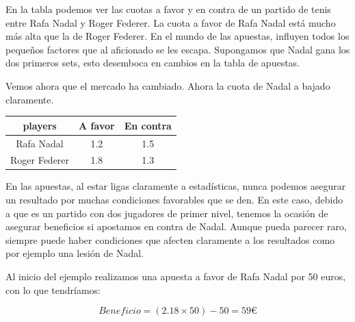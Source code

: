 
En la tabla
podemos ver las cuotas a favor y en contra de un partido de tenis entre Rafa Nadal y Roger Federer. La cuota a favor de Rafa Nadal está mucho más alta que la de Roger Federer.  En el mundo de las apuestas, influyen todos los pequeños factores que al aficionado se les escapa. Supongamos que Nadal gana los dos primeros sets, esto desemboca en cambios en la tabla de apuestas. 

  Vemos ahora que el mercado ha cambiado. Ahora la cuota de Nadal a bajado claramente.
   
 \begin{center}
    \begin{tabular}{| c | c | c |}
      \hline
      \hline
      players & A favor & En contra\\
      \hline
      \hline
      Rafa Nadal & 1.2 & 1.5\\
      \hline
      \hline
      Roger Federer & 1.8 & 1.3\\
      \hline
      \hline
    \end{tabular}
  \end{center}
  
  
En las apuestas, al estar ligas claramente a estadísticas, nunca podemos asegurar un resultado por muchas condiciones favorables que se den. En este caso, debido a que es un partido con dos jugadores de primer nivel, tenemos la ocasión de asegurar beneficios si apostamos en contra de Nadal. Aunque pueda parecer raro, siempre puede haber condiciones que afecten claramente a los resultados como por ejemplo una lesión de Nadal.

Al inicio del ejemplo realizamos una apuesta a favor de Rafa Nadal por 50 euros, con lo que tendríamos:

	 
\begin{displaymath}
  Beneficio = (2.18 \times 50) - 50 =  59 \euro  
\end{displaymath}


